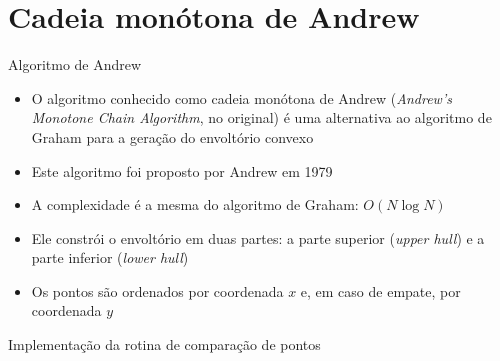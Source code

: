 \section{Cadeia monótona de Andrew}

\begin{frame}[fragile]{Algoritmo de Andrew}

    \begin{itemize}
        \item O algoritmo conhecido como cadeia monótona de Andrew (\textit{Andrew's Monotone
            Chain Algorithm}, no original) é uma alternativa ao algoritmo de Graham para a
            geração do envoltório convexo
        \pause

        \item Este algoritmo foi proposto por Andrew em 1979
        \pause

        \item A complexidade é a mesma do algoritmo de Graham: $O(N\log N)$
        \pause

        \item Ele constrói o envoltório em duas partes: a parte superior (\textit{upper hull})
            e a parte inferior (\textit{lower hull})
        \pause

        \item Os pontos são ordenados por coordenada $x$ e, em caso de empate, por coordenada $y$
    \end{itemize}

\end{frame}



\begin{frame}[fragile]{Implementação da rotina de comparação de pontos}
\end{frame}

